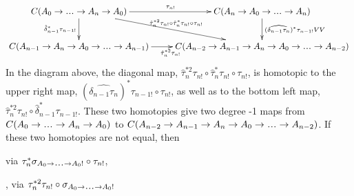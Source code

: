 $$
\xymatrix{
C(A_0 \to \smdots \to A_n \to A_0)
  \ar[r]^{\tau_{n!}}
  \ar[d]_{\hat{\delta}_{n-1}^*\tau_{n-1!}} 
  \ar[rd]^{\hat{\tau}_n^{*2} \tau_{n!}\circ 
  \hat{\tau}_n^*\tau_{n!}\circ \tau_{n!}}
& C(A_n \to A_0 \to \smdots \to A_n)
  \ar[d]^{(\widehat{\delta_{n-1}\tau_n})^*
  \tau_{n-1!}VV}\\
C(A_{n-1} \to A_n \to A_0 \to \smdots \to A_{n-1})
  \ar[r]_{\hat{\tau}_n^{*2}\tau_{n!}} 
&C(A_{n-2} \to A_{n-1} \to A_n \to A_0 \to \smdots \to A_{n-2})
}
$$
In the diagram above, the diagonal map, 
$\hat{\tau}_n^{*2} \tau_{n!}\circ 
\hat{\tau}_n^*\tau_{n!}\circ \tau_{n!}$, is 
homotopic to the upper right map, 
$(\widehat{\delta_{n-1}\tau_n})^* \tau_{n-1!}
\circ \tau_{n!}$, as well as to
the bottom left map, 
$\hat{\tau}_n^{*2}\tau_{n!} 
\circ \hat{\delta}_{n-1}^*\tau_{n-1!}$. 
These two homotopies give two 
degree -1 maps from 
$C(A_0 \to \smdots \to A_n \to A_0)$ 
to $C(A_{n-2} \to A_{n-1} \to A_n \to 
A_0 \to \smdots \to A_{n-2})$. 
If these two homotopies are not 
equal, then 

via $\tau_n^*
\sigma_{A_0 \to \smdots \to A_0!}\circ \tau_{n!}$,

, 
via $\tau_n^{*2} \tau_{n!} \circ 
\sigma_{A_0 \to \smdots \to A_0!}$
